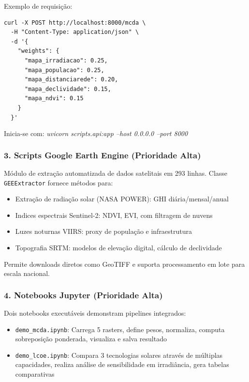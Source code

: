 \documentclass[12pt, a4paper]{article}
\begin{document}
Exemplo de requisição:
\begin{verbatim}
curl -X POST http://localhost:8000/mcda \
  -H "Content-Type: application/json" \
  -d '{
    "weights": {
      "mapa_irradiacao": 0.25,
      "mapa_populacao": 0.25,
      "mapa_distanciarede": 0.20,
      "mapa_declividade": 0.15,
      "mapa_ndvi": 0.15
    }
  }'
\end{verbatim}

Inicia-se com: \textit{uvicorn scripts.api:app --host 0.0.0.0 --port 8000}

\subsubsection{3. Scripts Google Earth Engine (Prioridade Alta)}

Módulo de extração automatizada de dados satelitais em 293 linhas. Classe \texttt{GEEExtractor} fornece métodos para:

\begin{itemize}
    \item Extração de radiação solar (NASA POWER): GHI diária/mensal/anual
    \item Indices espectrais Sentinel-2: NDVI, EVI, com filtragem de nuvens
    \item Luzes noturnas VIIRS: proxy de população e infraestrutura
    \item Topografia SRTM: modelos de elevação digital, cálculo de declividade
\end{itemize}

Permite downloads diretos como GeoTIFF e suporta processamento em lote para escala nacional.

\subsubsection{4. Notebooks Jupyter (Prioridade Alta)}

Dois notebooks executáveis demonstram pipelines integrados:

\begin{itemize}
    \item \texttt{demo\_mcda.ipynb}: Carrega 5 rasters, define pesos, normaliza, computa sobreposição ponderada, visualiza e salva resultado
    \item \texttt{demo\_lcoe.ipynb}: Compara 3 tecnologias solares através de múltiplas capacidades, realiza análise de sensibilidade em irradiância, gera tabelas comparativas
\end{itemize}
\end{document}
